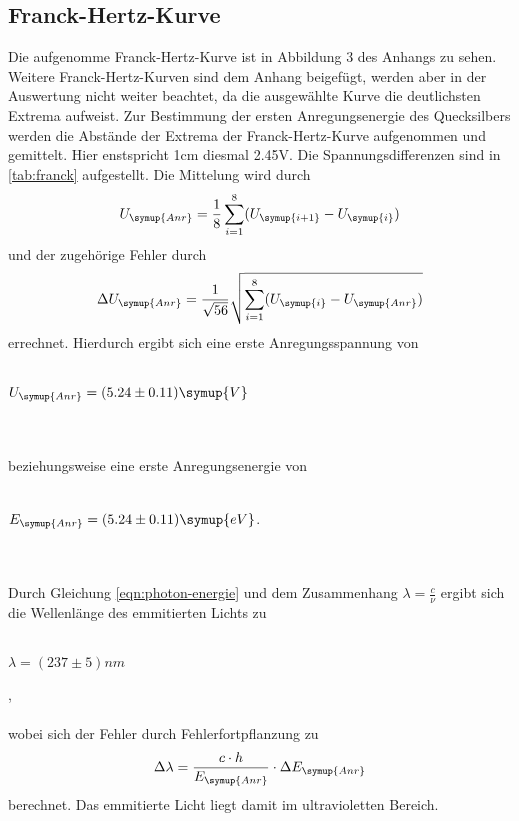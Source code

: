     \subsection{Franck-Hertz-Kurve} 
    \label{sec:franck}
    Die aufgenomme Franck-Hertz-Kurve ist in Abbildung 3 des Anhangs zu sehen. 
    Weitere Franck-Hertz-Kurven sind dem Anhang beigefügt, werden aber in der Auswertung nicht weiter beachtet,
    da die ausgewählte Kurve die deutlichsten Extrema aufweist. Zur Bestimmung der ersten Anregungsenergie des Quecksilbers
    werden die Abstände der Extrema der Franck-Hertz-Kurve aufgenommen und gemittelt. Hier enstspricht 1cm diesmal 2.45V. Die Spannungsdifferenzen
    sind in \autoref{tab:franck} aufgestellt. Die Mittelung wird durch
    \begin{equation}
      U_{\symup{Anr}} = \frac{1}{8} \sum_{i = 1}^{8} (U_{\symup{i+1}} - U_{\symup{i}})
    \end{equation}  
    und der zugehörige Fehler durch 
    \begin{equation}
      \Delta U_{\symup{Anr}} = \frac{1}{\sqrt{56}} \sqrt{ \sum_{i = 1}^{8} (U_{\symup{i}} - U_{\symup{Anr}}) }
    \end{equation}
    errechnet. Hierdurch ergibt sich eine erste Anregungsspannung von 
    \\ \\
    \centerline{$U_{\symup{Anr}} = (5.24 \pm 0.11) \symup{V}$}
    \\ \\
    beziehungsweise eine erste Anregungsenergie von
    \\ \\
    \centerline{$E_{\symup{Anr}} = (5.24 \pm 0.11) \symup{eV}$.}
    \\ \\  
    Durch Gleichung \eqref{eqn:photon-energie} und dem Zusammenhang $\lambda = \frac{c}{\nu}$ ergibt sich die Wellenlänge des emmitierten Lichts zu
    \\ \\
    \centerline{$\lambda = (237 \pm 5) nm$},
    \\ \\
    wobei sich der Fehler durch Fehlerfortpflanzung zu
    \begin{equation}
      \Delta \lambda = \frac{c \cdot h}{E_{\symup{Anr}}} \cdot \Delta E_{\symup{Anr}}
    \end{equation}
    berechnet. Das emmitierte Licht liegt damit im ultravioletten Bereich. 
    

